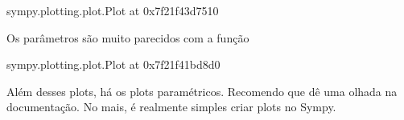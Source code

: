 \documentclass[letterpaper,10pt,english]{jupyterBook}
\begin{document}
\begin{sphinxVerbatim}[commandchars=\\\{\}]
\PYGZlt{}sympy.plotting.plot.Plot at 0x7f21f43d7510\PYGZgt{}
\end{sphinxVerbatim}

\sphinxAtStartPar
Os parâmetros são muito parecidos com a função 

\begin{sphinxVerbatim}[commandchars=\\\{\}]
     
\end{sphinxVerbatim}

\noindent{}

\begin{sphinxVerbatim}[commandchars=\\\{\}]
\PYGZlt{}sympy.plotting.plot.Plot at 0x7f21f41bd8d0\PYGZgt{}
\end{sphinxVerbatim}

\sphinxAtStartPar
Além desses plots, há os plots paramétricos. Recomendo que dê uma olhada na documentação. No mais, é realmente simples criar plots no Sympy.
\end{document}
